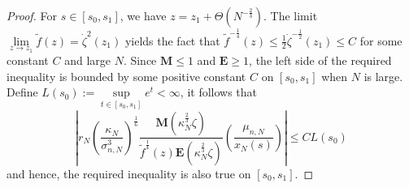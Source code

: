 \documentclass[11pt]{article}
\numberwithin{equation}{section}%
\numberwithin{theorem}{section}
\begin{document}
\begin{proof}
For $s\in[s_0,s_1]$, we have $z=z_1+\Theta\left(N^{-\frac{2}{3}}\right)$. The limit $\lim\limits_{z\rightarrow z_1}\tilde{f}(z)=\dot{\zeta}^2(z_1)$ yields the fact that $\tilde{f}^{-\frac{1}{4}}(z)\le \frac{1}{2}\dot{\zeta}^{-\frac{1}{2}}({z_1})\le C$ for some constant $C$ and large $N$. Since $\mathbf{ M}\le1$ and $\mathbf{ E}\ge 1$, the left side of the required inequality is bounded by some positive constant $C$ on $[s_0,s_1]$ when $N$ is large. Define $L(s_0):=\sup\limits_{t\in[s_0,s_1]}e^{t}<\infty$, it follows that
\begin{equation*}
      \left|r_N\left(\frac{\kappa_N}{\sigma_{n,N}^3}\right)^{\frac{1}{6}}\frac{\mathbf{M}\left(\kappa_N^\frac{2}{3}\zeta\right)}{\tilde{f}^\frac{1}{4}(z)\mathbf{E}\left(\kappa_N^\frac{2}{3}\zeta\right)}\left(\frac{\mu_{n,N}}{x_N(s)}\right)\right|\le CL(s_0)
\end{equation*}
and hence, the required inequality is also true on $[s_0,s_1]$.\end{proof}
\end{document}
